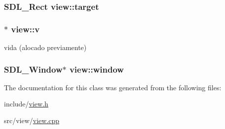 \subsubsection[{\texorpdfstring{target}{target}}]{\setlength{\rightskip}{0pt plus 5cm}S\+D\+L\+\_\+\+Rect view\+::target\hspace{0.3cm}{\ttfamily [private]}}\hypertarget{classview_a49a628eedba666db008f8c07b96e3a51}{}\label{classview_a49a628eedba666db008f8c07b96e3a51}
\subsubsection[{\texorpdfstring{v}{v}}]{$\ast$ view\+::v\hspace{0.3cm}{\ttfamily [private]}}\hypertarget{classview_ae0f8e281f5f7937d84f435437ce03546}{}\label{classview_ae0f8e281f5f7937d84f435437ce03546}
vida (alocado previamente) 
\subsubsection[{\texorpdfstring{window}{window}}]{\setlength{\rightskip}{0pt plus 5cm}S\+D\+L\+\_\+\+Window$\ast$ view\+::window\hspace{0.3cm}{\ttfamily [private]}}\hypertarget{classview_ade09c2dbabd1bf59ffaf625156c514f0}{}\label{classview_ade09c2dbabd1bf59ffaf625156c514f0}


The documentation for this class was generated from the following files\+:\begin{DoxyCompactItemize}
\item 
include/\hyperlink{view_8h}{view.\+h}\item 
src/view/\hyperlink{view_8cpp}{view.\+cpp}\end{DoxyCompactItemize}
